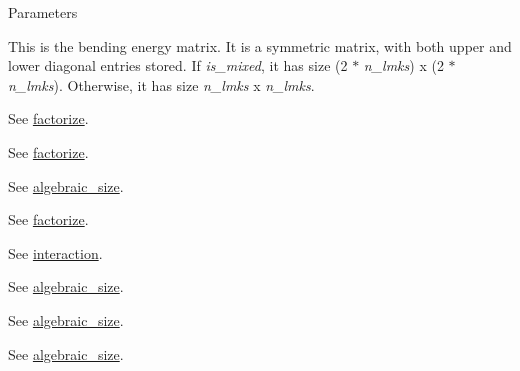\begin{DoxyParams}{Parameters}
\item[\mbox{\tt[out]} {\em B}]This is the bending energy matrix. It is a symmetric matrix, with both upper and lower diagonal entries stored. If {\itshape is\_\-mixed\/}, it has size (2 $\ast$ {\itshape n\_\-lmks\/}) x (2 $\ast$ {\itshape n\_\-lmks\/}). Otherwise, it has size {\itshape n\_\-lmks\/} x {\itshape n\_\-lmks\/}. \item[\mbox{\tt[in]} {\em F}]See \hyperlink{classew_1_1Tps2_a07f500b8a093d45384ee6d90dd2c226a}{factorize}. \item[\mbox{\tt[in]} {\em pivots}]See \hyperlink{classew_1_1Tps2_a07f500b8a093d45384ee6d90dd2c226a}{factorize}. \item[\mbox{\tt[in]} {\em relax\_\-dims\_\-opt}]See \hyperlink{classew_1_1Tps2_a448c7039e42cb7fad800461bacc48c72}{algebraic\_\-size}. \item[\mbox{\tt[in]} {\em relax\_\-params\_\-opt}]See \hyperlink{classew_1_1Tps2_a07f500b8a093d45384ee6d90dd2c226a}{factorize}. \item[\mbox{\tt[in]} {\em n\_\-lmks}]See \hyperlink{classew_1_1Tps2_a7f04e98fa574f821257e904658b2bb8b}{interaction}. \item[\mbox{\tt[in]} {\em f\_\-size}]See \hyperlink{classew_1_1Tps2_a448c7039e42cb7fad800461bacc48c72}{algebraic\_\-size}. \item[\mbox{\tt[in]} {\em is\_\-mixed}]See \hyperlink{classew_1_1Tps2_a448c7039e42cb7fad800461bacc48c72}{algebraic\_\-size}. \item[\mbox{\tt[in]} {\em is\_\-reduced}]See \hyperlink{classew_1_1Tps2_a448c7039e42cb7fad800461bacc48c72}{algebraic\_\-size}. \end{DoxyParams}

